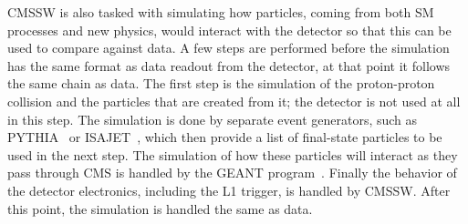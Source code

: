 CMSSW is also tasked with simulating how particles, coming from both SM processes and new physics, would interact with the detector so that this can be used to
compare against data. A few steps are performed before the simulation has the same format as data readout from the detector, at that
point it follows the same chain as data. The first step is the simulation of the proton-proton collision
and the particles that are created from it; the detector is not used at all in this step. 
The simulation is done by separate event generators, such as PYTHIA~\cite{Sjostrand:2006za} or ISAJET~\cite{Paige:2003mg},
which then provide a list of final-state particles to be used in the next step.
The simulation of how these particles will interact as they pass through CMS is handled by the GEANT program~\cite{Lefebure:1999wja}.
Finally the behavior of the detector electronics, including the L1 trigger, is handled by CMSSW.
After this point, the simulation is handled the same as data.
